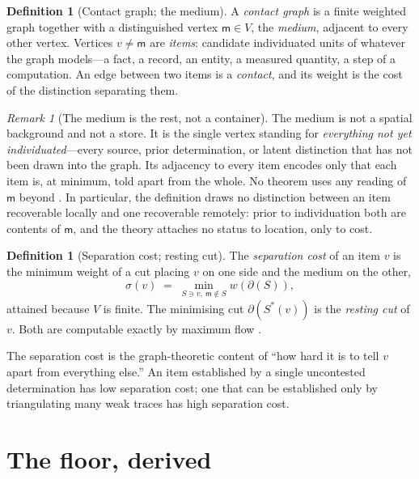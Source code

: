 \documentclass[11pt,twocolumn,a4paper]{article}
\theoremstyle{dirthm}
\theoremstyle{definition}
\newtheorem{definition}[theorem]{Definition}
\theoremstyle{remark}
\newtheorem{remark}[theorem]{Remark}
\newcommand{\V}{V}
\newcommand{\wt}{w}
\newcommand{\med}{\mathsf{m}}
\newcommand{\cut}{\partial}
\newcommand{\str}{\sigma}
\begin{document}
\begin{definition}[Contact graph; the medium]
\label{def:contact}
A \emph{contact graph} is a finite weighted graph together with a
distinguished vertex $\med\in\V$, the \emph{medium}, adjacent to every other
vertex. Vertices $v\neq\med$ are \emph{items}: candidate individuated units
of whatever the graph models---a fact, a record, an entity, a measured
quantity, a step of a computation. An edge between two items is a
\emph{contact}, and its weight is the cost of the distinction separating
them.
\end{definition}

\begin{remark}[The medium is the rest, not a container]
\label{rem:medium}
The medium is not a spatial background and not a store. It is the single
vertex standing for \emph{everything not yet individuated}---every source,
prior determination, or latent distinction that has not been drawn into the
graph. Its adjacency to every item encodes only that each item is, at
minimum, told apart from the whole. No theorem uses any reading of $\med$
beyond . In particular, the definition draws no
distinction between an item recoverable locally and one recoverable
remotely: prior to individuation both are contents of $\med$, and the theory
attaches no status to location, only to cost.
\end{remark}

\begin{definition}[Separation cost; resting cut]
\label{def:sepcost}
The \emph{separation cost} of an item $v$ is the minimum weight of a cut
placing $v$ on one side and the medium on the other,
\[
\str(v)\;=\;\min_{S\ni v,\ \med\notin S}\wt(\cut(S)),
\]
attained because $\V$ is finite. The minimising cut $\cut(S^{\ast}(v))$ is
the \emph{resting cut} of $v$. Both are computable exactly by maximum flow
\citep{fordfulkerson1956,menger1927}.
\end{definition}

The separation cost is the graph-theoretic content of ``how hard it is to
tell $v$ apart from everything else.'' An item established by a single
uncontested determination has low separation cost; one that can be
established only by triangulating many weak traces has high separation cost.

\section{The floor, derived}
\label{sec:floor}
\end{document}
